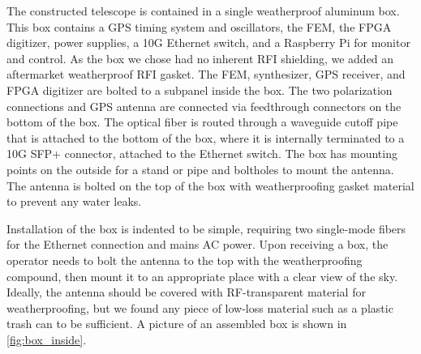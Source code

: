 The constructed telescope is contained in a single weatherproof aluminum box.
This box contains a GPS timing system and oscillators, the FEM, the FPGA digitizer, power supplies, a 10G Ethernet switch, and a Raspberry Pi for monitor and control.
As the box we chose had no inherent RFI shielding, we added an aftermarket weatherproof RFI gasket.
The FEM, synthesizer, GPS receiver, and FPGA digitizer are bolted to a subpanel inside the box.
The two polarization connections and GPS antenna are connected via feedthrough connectors on the bottom of the box.
The optical fiber is routed through a waveguide cutoff pipe that is attached to the bottom of the box, where it is internally terminated to a 10G SFP+ connector, attached to the Ethernet switch.
The box has mounting points on the outside for a stand or pipe and boltholes to mount the antenna.
The antenna is bolted on the top of the box with weatherproofing gasket material to prevent any water leaks.

Installation of the box is indented to be simple, requiring two single-mode fibers for the Ethernet connection and mains AC power.
Upon receiving a box, the operator needs to bolt the antenna to the top with the weatherproofing compound, then mount it to an appropriate place with a clear view of the sky.
Ideally, the antenna should be covered with RF-transparent material for weatherproofing, but we found any piece of low-loss material such as a plastic trash can to be sufficient.
A picture of an assembled box is shown in \autoref{fig:box_inside}.
